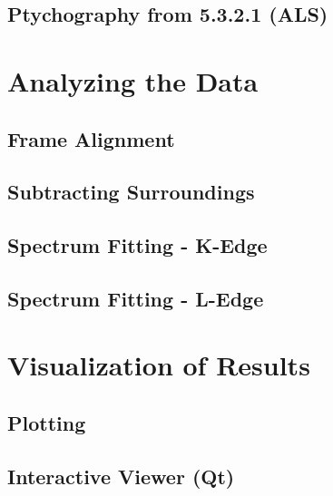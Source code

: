 \documentclass[letterpaper,10pt,english]{sphinxmanual}
\begin{document}
\section{Ptychography from 5.3.2.1 (ALS)}
\label{\detokenize{importing:ptychography-from-5-3-2-1-als}}

\chapter{Analyzing the Data}
\label{\detokenize{analysis:analyzing-the-data}}\label{\detokenize{analysis::doc}}

\section{Frame Alignment}
\label{\detokenize{analysis:frame-alignment}}

\section{Subtracting Surroundings}
\label{\detokenize{analysis:subtracting-surroundings}}

\section{Spectrum Fitting - K-Edge}
\label{\detokenize{analysis:spectrum-fitting-k-edge}}

\section{Spectrum Fitting - L-Edge}
\label{\detokenize{analysis:spectrum-fitting-l-edge}}

\chapter{Visualization of Results}
\label{\detokenize{visualization:visualization-of-results}}\label{\detokenize{visualization::doc}}

\section{Plotting}
\label{\detokenize{visualization:plotting}}

\section{Interactive Viewer (Qt)}
\label{\detokenize{visualization:interactive-viewer-qt}}
\end{document}
